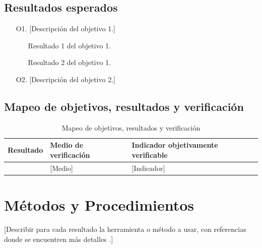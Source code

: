 \subsection{Resultados esperados}
\begin{enumerate}
  \item[O1.] [Descripción del objetivo 1.]
  \begin{itemize}
    \item [Resultado 1 del objetivo 1.]
    \item [Resultado 2 del objetivo 1.]
  \end{itemize}
  \item[O2.] [Descripción del objetivo 2.]
\end{enumerate}

\subsection{Mapeo de objetivos, resultados y verificación}

\begin{table}[H]
  \centering
  \caption{Mapeo de objetivos, resultados y verificación}
  \label{tab:mapping}
  \begin{tabular}{|p{4cm}|p{4cm}|p{5cm}|}
    \hline
    \textbf{Resultado} & \textbf{Medio de verificación} & \textbf{Indicador objetivamente verificable} \\
    \hline
    [Resultado 1] & [Medio] & [Indicador] \\
    \hline
  \end{tabular}
\end{table}

\section{Métodos y Procedimientos}
[Describir para cada resultado la herramienta o método a usar,
con referencias donde se encuentren más detalles \citex.]
